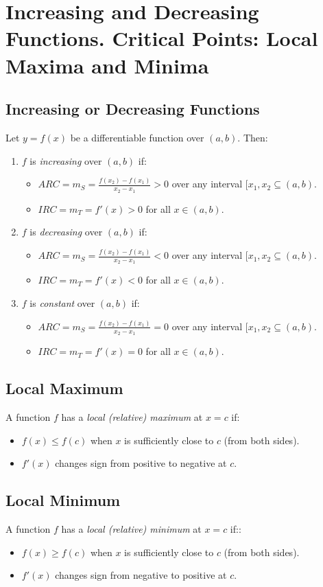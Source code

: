 \section{Increasing and Decreasing Functions. Critical Points: Local Maxima and Minima}
\subsection{Increasing or Decreasing Functions}
	Let $y=f(x)$ be a differentiable function over $(a,b)$.
	Then:
	\begin{enumerate}
		\item $f$ is \emph{increasing} over $(a,b)$ if:
			\begin{itemize}
				\item $ARC = m_S = \frac{f(x_2) - f(x_1)}{x_2 - x_1} > 0$ over any interval $[x_1,x_2 \subseteq (a, b)$.
				\item $IRC = m_T = f'(x) > 0$ for all $x \in (a,b)$.
			\end{itemize}
		\item $f$ is \emph{decreasing} over $(a,b)$ if:
			\begin{itemize}
				\item $ARC = m_S = \frac{f(x_2) - f(x_1)}{x_2 - x_1} < 0$ over any interval $[x_1,x_2 \subseteq (a, b)$.
				\item $IRC = m_T = f'(x) < 0$ for all $x \in (a,b)$.
			\end{itemize}
		\item $f$ is \emph{constant} over $(a,b)$ if:
			\begin{itemize}
				\item $ARC = m_S = \frac{f(x_2) - f(x_1)}{x_2 - x_1} = 0$ over any interval $[x_1,x_2 \subseteq (a, b)$.
				\item $IRC = m_T = f'(x) = 0$ for all $x \in (a,b)$.
			\end{itemize}
	\end{enumerate}
\subsection{Local Maximum}
	A function $f$ has a \emph{local (relative) maximum} at $x=c$ if:
	\begin{itemize}
		\item $f(x) \leq f(c)$ when $x$ is sufficiently close to $c$ (from both sides).
		\item $f'(x)$ changes sign from positive to negative at $c$.
	\end{itemize}
\subsection{Local Minimum}
	A function $f$ has a \emph{local (relative) minimum} at $x=c$ if::
	\begin{itemize}
		\item $f(x) \geq f(c)$ when $x$ is sufficiently close to $c$ (from both sides).
		\item $f'(x)$ changes sign from negative to positive at $c$.
	\end{itemize}
